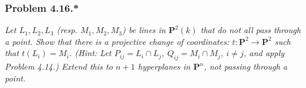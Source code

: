 \documentclass{article}
\begin{document}



\subsubsection*{Problem 4.16.*}
\emph{Let $L_1, L_2, L_3$ (resp. $M_1, M_2, M_3$) be lines in $\mathbf{P}^{2}(k)$ that
do not all pass through a point.
Show that there is a projective change of coordinates: $t: \mathbf{P}^{2} \to \mathbf{P}^{2}$
such that $t(L_i) = M_i$.
(Hint: Let $P_{ij} = L_i \cap L_j$, $Q_{ij} = M_i \cap M_j$, $i \neq j$,
and apply Problem 4.14.)
Extend this to $n+1$ hyperplanes in $\mathbf{P}^{n}$,
not passing through a point.} \\
\end{document}

